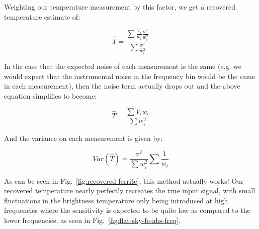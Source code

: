Weighting our temperature measurement by this factor, we get a recovered 
temperature estimate of:

\begin{equation}
     \hat{T} = \frac{\sum \frac{V_i}{w_i} \frac{\sigma^2}{w_i^2}}{\sum 
     \frac{\sigma^2}{w_i^2}}
     \label{eq:measured-T}
\end{equation}

In the case that the expected noise of each measurement is the same (e.g. we 
would expect that the instrumental noise in the frequency bin would be the same 
in each measurement), then the noise term actually drops out and the above 
equation simplifies to become:

\begin{equation}
     \hat{T} = \frac{\sum V_i w_i}{\sum w_i^2}
     \label{eq:measured-T-simplified}
\end{equation}

And the variance on each measurement is given by:

\begin{equation}
    Var(\hat{T}) = \frac{\sigma^2}{\sum w_i^2} \sum \frac{1}{w_i}
    \label{eq:measured-T-variance}
\end{equation}

As can be seen in Fig.~\ref{fig:recovered-ferrite}, this method actually works!  
Our recovered temperature nearly perfectly recreates the true input signal, 
with small fluctuations in the brightness temperature only being introduced at 
high frequencies where the sensitivity is expected to be quite low as compared 
to the lower frequencies, as seen in Fig.~\ref{fig:flat-sky-fe-abs-freq}.

